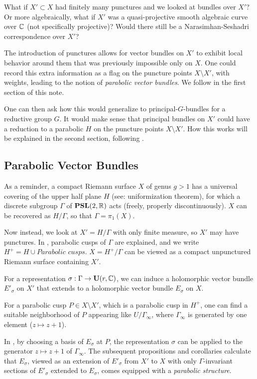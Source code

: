 What if $X'\subset X$ had finitely many punctures and we looked at bundles over $X'$? Or more algebraically, what if $X'$ was a quasi-projective smooth algebraic curve over $\mathbb{C}$ (not specifically projective)? Would there still be a Narasimhan-Seshadri correspondence over $X'$?

The introduction of punctures allows for vector bundles on $X'$ to exhibit local behavior around them that was previously impossible only on $X$. One could record this extra information as a flag on the puncture points $X\setminus X'$, with weights, leading to the notion of \textit{parabolic vector bundles}. We follow \cite{mehtasesh} in the first section of this note.

One can then ask how this would generalize to principal-$G$-bundles for a reductive group $G$. It would make sense that principal bundles on $X'$ could have a reduction to a parabolic $H$ on the puncture points $X\setminus X'$. How this works will be explained in the second section, following \cite{pr}.

\subsection{Parabolic Vector Bundles}

As a reminder, a compact Riemann surface $X$ of genus $g>1$ has a universal covering of the upper half plane $H$ (see: uniformization theorem), for which a discrete subgroup $\Gamma$ of $\mathbf{PSL}(2,\mathbb{R})$ acts (freely, properly discontinuously). $X$ can be recovered as $H/\Gamma$, so that $\Gamma=\pi_1(X)$.

Now instead, we look at $X'=H/\Gamma$ with only finite measure, so $X'$ may have punctures. In \cite{stackex}, parabolic cusps of $\Gamma$ are explained, and we write $H^+=H\cup\textit{Parabolic cusps}$. $X=H^+/\Gamma$ can be viewed as a compact unpunctured Riemann surface containing $X'$.

For a representation $\sigma:\Gamma\rightarrow\mathbf{U}(r,\mathbb{C})$, we can induce a holomorphic vector bundle $E'_\sigma$ on $X'$ that extends to a holomorphic vector bundle $E_\sigma$ on $X$.

For a parabolic cusp $P\in X\setminus X'$, which is a parabolic cusp in $H^+$, one can find a suitable neighborhood of $P$ appearing like $U/\Gamma_\infty$, where $\Gamma_\infty$ is generated by one element ($z\mapsto z+1$).

In \cite{mehtasesh}, by choosing a basis of $E_\sigma$ at $P$, the representation $\sigma$ can be applied to the generator $z\mapsto z+1$ of $\Gamma_\infty$. The subsequent propositions and corollaries calculate that $E_\sigma$, viewed as an extension of $E'_\sigma$ from $X'$ to $X$ with only $\Gamma$-invariant sections of $E'_\sigma$ extended to $E_\sigma$, comes equipped with a \textit{parabolic structure}.

